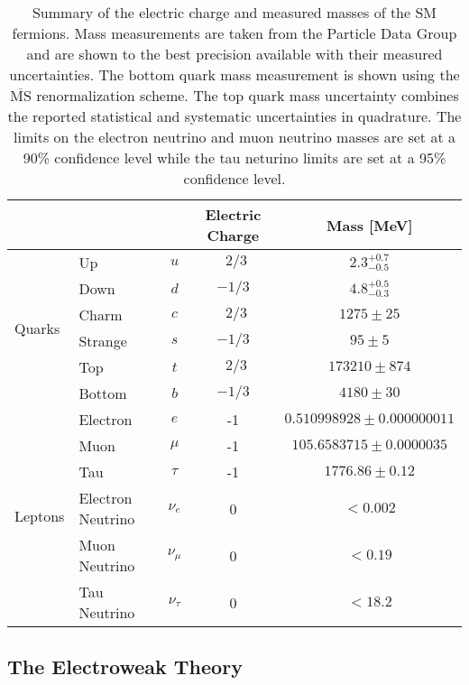 \begin{table}[ht]
\centering
\begin{tabular}{|llc|c|c|}
\hline
                        & &   & Electric Charge & Mass [MeV]\\
\hline
\multirow{6}{*}{Quarks}& Up & $u$   &  $~~2/3$    &  $2.3 ^{+0.7}_{-0.5}$    \\
                       & Down & $d$  &  $-1/3$    &  $4.8^{+0.5}_{-0.3}$    \\
                       & Charm & $c$   & $~~2/3$     & $1275 \pm 25$     \\
                       & Strange & $s$   & $-1/3$     & $95 \pm 5$     \\
                       & Top & $t$   &  $~~2/3$    &  $173210 \pm 874$    \\
                       & Bottom & $b$   &  $-1/3$    & $4180 \pm 30$     \\
\hline
\hline
\multirow{6}{*}{Leptons}& Electron & $e$     &  -1    &  $0.510998928 \pm 0.000000011$ \\
                        & Muon & $\mu$     &   -1   &   $105.6583715 \pm 0.0000035$   \\
                        & Tau & $\tau$     &   -1   &  $1776.86 \pm 0.12$    \\
                        & Electron Neutrino & $\nu_e$  & 0    &   $ < 0.002$    \\
                        & Muon Neutrino & $\nu_{\mu}$  & 0   &  $ < 0.19$    \\
                        & Tau Neutrino & $\nu_{\tau}$  & 0    &  $< 18.2 $    \\
\hline
\end{tabular}
\label{tab:theory_fermions}
\caption{Summary of the electric charge and measured masses of the SM fermions. Mass measurements
are taken from the Particle Data Group \cite{PDG:2014} and 
are shown to the best precision available with their measured uncertainties.
The bottom quark mass measurement is shown using the $\overline{\textrm{MS}}$ 
renormalization scheme.
The top quark mass uncertainty combines the reported statistical and systematic uncertainties 
in quadrature.
The limits on the electron neutrino and muon neutrino masses are set at a 90\% confidence level 
while the tau neturino limits are set at a 95\% confidence level.}
\end{table}

\subsection{The Electroweak Theory}

